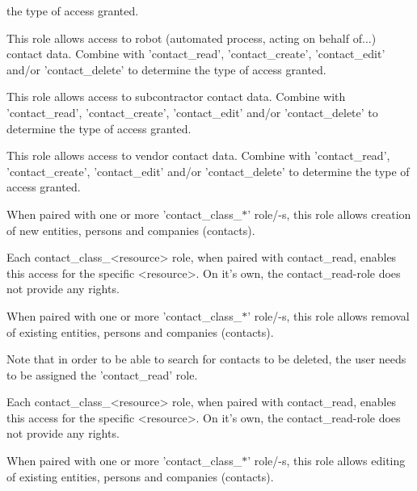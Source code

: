 \begin{description}[style=nextline]
                         the type of access granted.
\item [contact\_class\_robot] \htmlspacing 
                         This role allows access to robot (automated process, acting on behalf of...) contact data.
                         Combine with 'contact\_read', 'contact\_create', 'contact\_edit' and/or 'contact\_delete' to determine
                         the type of access granted.
\item [contact\_class\_sub\_contractor] \htmlspacing 
                         This role allows access to subcontractor contact data.
                         Combine with 'contact\_read', 'contact\_create', 'contact\_edit' and/or 'contact\_delete' to determine
                         the type of access granted.
\item [contact\_class\_vendor] \htmlspacing 
                         This role allows access to vendor contact data.
                         Combine with 'contact\_read', 'contact\_create', 'contact\_edit' and/or 'contact\_delete' to determine
                         the type of access granted.
\item [contact\_create] \htmlspacing 
                         When paired with one or more 'contact\_class\_$\ast$' role/-s, this role allows
                         creation of new entities, persons and companies (contacts).

                         Each contact\_class\_\textless{}resource\textgreater{} role, when paired with contact\_read, enables
                         this access for the specific \textless{}resource\textgreater{}. On it's own, the contact\_read-role
                         does not provide any rights.
\item [contact\_delete] \htmlspacing 
                         When paired with one or more 'contact\_class\_$\ast$' role/-s, this role allows
                         removal of existing entities, persons and companies (contacts).

                         Note that in order to be able to search for contacts to be deleted, the user
                         needs to be assigned the 'contact\_read' role.

                         Each contact\_class\_\textless{}resource\textgreater{} role, when paired with contact\_read, enables
                         this access for the specific \textless{}resource\textgreater{}. On it's own, the contact\_read-role
                         does not provide any rights.
\item [contact\_edit] \htmlspacing 
                         When paired with one or more 'contact\_class\_$\ast$' role/-s, this role allows
                         editing of existing entities, persons and companies (contacts).


\end{description}
